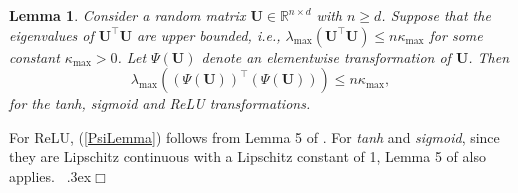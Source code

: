 \documentclass[11pt]{article}
\newcommand{\bU}{{\boldsymbol U}}
\newtheorem{lemma}{Lemma}[section]
\newenvironment{proof}{\trivlist\item[\hskip \labelsep{\sc Proof:}]}
 {\unskip\nobreak\ \lower.3ex\hbox{$\Box$}\endtrivlist}
\begin{document}
\begin{lemma} \label{lemma:eigen} 
Consider a random matrix $\bU\in \mathbb{R}^{n\times d}$ with $n \geq d$.  
Suppose that 
the eigenvalues of $\bU^{\top}\bU$ are upper bounded, i.e.,  
$\lambda_{\max}(\bU^{\top}\bU) \leq n \kappa_{\max}$ for some constant $\kappa_{\max}>0$.  
Let $\Psi(\bU)$ denote an elementwise transformation of $\bU$. Then 
\begin{equation} \label{PsiLemma}
\lambda_{\max}\left( (\Psi(\bU))^{\top} (\Psi(\bU)) \right) \leq n \kappa_{\max},
\end{equation}
for the {\it tanh}, {\it sigmoid} and ReLU transformations. 
\end{lemma} 
\begin{proof}
For ReLU, (\ref{PsiLemma}) follows from Lemma 5 of \cite{Dittmer2018SingularVF}. For {\it tanh} and {\it sigmoid}, since they are Lipschitz continuous with a Lipschitz constant of 1, Lemma 5 of  \cite{Dittmer2018SingularVF} also applies. 
\end{proof}
\end{document}
